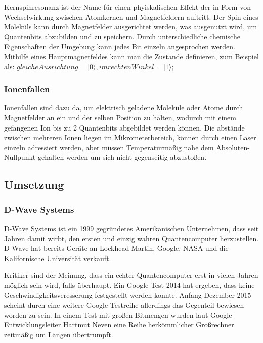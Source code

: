 Kernspinresonanz ist der Name für einen phyiskalischen Effekt der in Form von Wechselwirkung zwischen Atomkernen und Magnetfeldern auftritt. Der Spin eines Moleküls kann durch Magnetfelder ausgerichtet werden, was ausgenutzt wird, um Quantenbits abzubilden und zu speichern. Durch unterschiedliche chemische Eigenschaften der Umgebung kann jedes Bit einzeln angesprochen werden. Mithilfe eines Hauptmagnetfeldes kann man die Zustande definieren, zum Beispiel als: $gleiche Ausrichtung = |0\rangle, im rechten Winkel = |1\rangle$;


\subsubsection{Ionenfallen}
\label{sec:Ionenfallen}

Ionenfallen sind dazu da, um elektrisch geladene Moleküle oder Atome durch Magnetfelder an ein und der selben Position zu halten, wodurch mit einem gefangenen Ion bis zu 2 Quantenbits abgebildet werden können. Die abstände zwischen mehreren Ionen liegen im Mikrometerbereich, können durch einen Laser einzeln adressiert werden, aber müssen Temperaturmäßig nahe dem Absoluten-Nullpunkt gehalten werden um sich nicht gegenseitig abzustoßen.


\subsection{Umsetzung}
\label{sec:Umsetzung}

\subsubsection{D-Wave Systems}
\label{sec:D-Wave Systems}

D-Wave Systems ist ein 1999 gegründetes Amerikanischen Unternehmen, dass seit Jahren damit wirbt, den ersten und einzig wahren Quantencomputer herzustellen. D-Wave hat bereits Geräte an Lockhead-Martin, Google, NASA und die Kalifornische Universität verkauft.

Kritiker sind der Meinung, dass ein echter Quantencomputer erst in vielen Jahren möglich sein wird, falls überhaupt. Ein Google Test 2014 hat ergeben, dass keine Geschwindigkeitsveresserung festgestellt werden konnte. Anfang Dezember 2015 scheint durch eine weitere Google-Testreihe allerdings das Gegenteil bewiesen worden zu sein. In einem Test mit großen Bitmengen wurden laut Google Entwicklungsleiter Hartmut Neven eine Reihe herkömmlicher Großrechner zeitmäßig um Längen übertrumpft.

